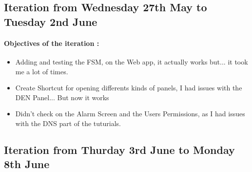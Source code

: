 \documentclass[../main.tex]{subfiles}
\begin{document}
\begin{appendix}
    \subsection{Iteration from Wednesday 27th May to Tuesday 2nd June}
    \paragraph{Objectives of the iteration :}
    \begin{itemize}
        \item Adding and testing the FSM, on the Web app, it actually works but... it took me a lot of times.
        \item Create Shortcut for opening differents kinds of panels, I had issues with the DEN Panel... But now it works
        \item Didn't check on the Alarm Screen and the Users Permissions, as I had issues with the DNS part of the tuturials.
    \end{itemize}

    \subsection{Iteration from Thurday 3rd June to Monday 8th June}

\end{appendix}
\end{document}
